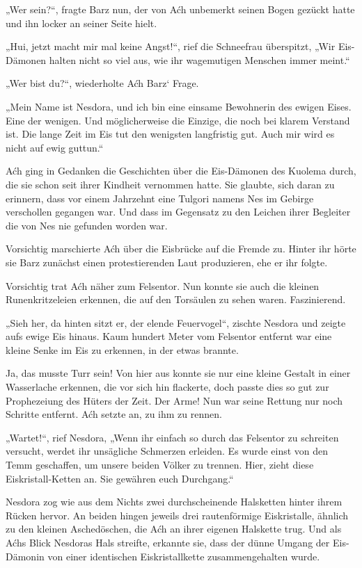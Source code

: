 „Wer sein?“, fragte Barz nun, der von Aćh unbemerkt seinen Bogen gezückt hatte und ihn locker an seiner Seite hielt.

„Hui, jetzt macht mir mal keine Angst!“, rief die Schneefrau überspitzt, „Wir Eis-Dämonen halten nicht so viel aus, wie ihr wagemutigen Menschen immer meint.“

„Wer bist du?“, wiederholte Aćh Barz‘ Frage.

„Mein Name ist Nesdora, und ich bin eine einsame Bewohnerin des ewigen Eises. Eine der wenigen. Und möglicherweise die Einzige, die noch bei klarem Verstand ist. Die lange Zeit im Eis tut den wenigsten langfristig gut. Auch mir wird es nicht auf ewig guttun.“

Aćh ging in Gedanken die Geschichten über die Eis-Dämonen des Kuolema durch, die sie schon seit ihrer Kindheit vernommen hatte. Sie glaubte, sich daran zu erinnern, dass vor einem Jahrzehnt eine Tulgori namens Nes im Gebirge verschollen gegangen war. Und dass im Gegensatz zu den Leichen ihrer Begleiter die von Nes nie gefunden worden war.

Vorsichtig marschierte Aćh über die Eisbrücke auf die Fremde zu. Hinter ihr hörte sie Barz zunächst einen protestierenden Laut produzieren, ehe er ihr folgte.

Vorsichtig trat Aćh näher zum Felsentor. Nun konnte sie auch die kleinen Runenkritzeleien erkennen, die auf den Torsäulen zu sehen waren. Faszinierend.

„Sieh her, da hinten sitzt er, der elende Feuervogel“, zischte Nesdora und zeigte aufs ewige Eis hinaus. Kaum hundert Meter vom Felsentor entfernt war eine kleine Senke im Eis zu erkennen, in der etwas brannte.

Ja, das musste Turr sein! Von hier aus konnte sie nur eine kleine Gestalt in einer Wasserlache erkennen, die vor sich hin flackerte, doch passte dies so gut zur Prophezeiung des Hüters der Zeit. Der Arme! Nun war seine Rettung nur noch Schritte entfernt. Aćh setzte an, zu ihm zu rennen.

„Wartet!“, rief Nesdora, „Wenn ihr einfach so durch das Felsentor zu schreiten versucht, werdet ihr unsägliche Schmerzen erleiden. Es wurde einst von den Temm geschaffen, um unsere beiden Völker zu trennen. Hier, zieht diese Eiskristall-Ketten an. Sie gewähren euch Durchgang.“

Nesdora zog wie aus dem Nichts zwei durchscheinende Halsketten hinter ihrem Rücken hervor. An beiden hingen jeweils drei rautenförmige Eiskristalle, ähnlich zu den kleinen Aschedöschen, die Aćh an ihrer eigenen Halskette trug. Und als Aćhs Blick Nesdoras Hals streifte, erkannte sie, dass der dünne Umgang der Eis-Dämonin von einer identischen Eiskristallkette zusammengehalten wurde.

